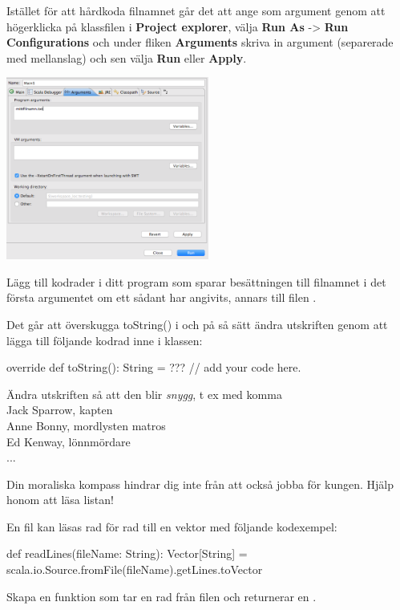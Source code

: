 Istället för att hårdkoda filnamnet går det att ange som argument genom att högerklicka på klassfilen i {\bf Project explorer}, välja {\bf Run As} -> {\bf Run Configurations} och under fliken {\bf Arguments} skriva in argument (separerade med mellanslag) och sen välja {\bf Run} eller {\bf Apply}. 
\begin{center}
\includegraphics[width=0.5\textwidth]{../img/pirates/args.png} \\
\end{center}

Lägg till kodrader i ditt program som sparar besättningen till filnamnet i det första argumentet om ett sådant har angivits, annars till filen .

\Subtask Det går att överskugga toString() i  och på så sätt ändra utskriften genom att lägga till följande kodrad inne i klassen: 
\begin{Code}
override def toString(): String = ??? // add your code here. 
\end{Code}

\noindent Ändra utskriften så att den blir {\em snygg}, t ex med komma\\ 

\noindent Jack Sparrow, kapten \\
Anne Bonny, mordlysten matros \\
Ed Kenway, lönnmördare \\
... 


\Subtask Din moraliska kompass hindrar dig inte från att också jobba för kungen. Hjälp honom att läsa listan!

En fil  kan läsas rad för rad till en vektor med följande kodexempel: 

\begin{Code}
def readLines(fileName: String): Vector[String] = {
	   scala.io.Source.fromFile(fileName).getLines.toVector
	}
\end{Code}
Skapa en funktion  som tar en rad från filen och returnerar en . 

